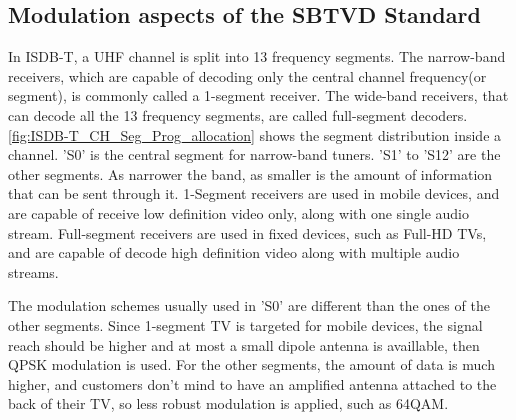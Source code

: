 \documentclass[
	12pt,				%
	openright,			%
	twoside,			%
	a4paper,			%
	brazil,
	french,				%
	english
	]{abntex2}
\begin{document}


%
%


\begin{apendicesenv}

\partapendices

\chapter{Modulation aspects of the SBTVD Standard}
\label{modulation}
In ISDB-T, a UHF channel is split into 13 frequency segments. The narrow-band receivers, which are capable of decoding only the central channel frequency(or segment), is commonly called a 1-segment receiver. The wide-band receivers, that can decode all the 13 frequency segments, are called full-segment decoders. \autoref{fig:ISDB-T_CH_Seg_Prog_allocation} shows the segment distribution inside a channel. 'S0' is the central segment for narrow-band tuners. 'S1' to 'S12' are the other segments. As narrower the band, as smaller is the amount of information that can be sent through it. 1-Segment receivers are used in mobile devices, and are capable of receive low definition video only, along with one single audio stream. Full-segment receivers are used in fixed devices, such as Full-HD TVs, and are capable of decode high definition video along with multiple audio streams.

The modulation schemes usually used in 'S0' are different than the ones of the other segments. Since 1-segment TV is targeted for mobile devices, the signal reach should be higher and at most a small dipole antenna is availlable, then QPSK modulation is used. For the other segments, the amount of data is much higher, and customers don't mind to have an amplified antenna attached to the back of their TV, so less robust modulation is applied, such as 64QAM. 


\end{apendicesenv}
\end{document}
